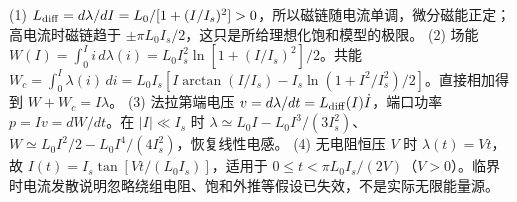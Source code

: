 (1) \(L_{\rm diff}=d\lambda/dI=L_0/[1+(I/I_s)^2]>0\)，所以磁链随电流单调，微分磁能正定；高电流时磁链趋于 \(\pm\pi L_0I_s/2\)，这只是所给理想化饱和模型的极限。
(2) 场能 \(W(I)=\int_0^I i\,d\lambda(i)=L_0I_s^2\ln[1+(I/I_s)^2]/2\)。共能 \(W_c=\int_0^I\lambda(i)\,di=L_0I_s[I\arctan(I/I_s)-I_s\ln(1+I^2/I_s^2)/2]\)。直接相加得到 \(W+W_c=I\lambda\)。
(3) 法拉第端电压 \(v=d\lambda/dt=L_{\rm diff}(I)\dot I\)，端口功率 \(p=Iv=dW/dt\)。在 \(|I|\ll I_s\) 时 \(\lambda\simeq L_0I-L_0I^3/(3I_s^2)\)、\(W\simeq L_0I^2/2-L_0I^4/(4I_s^2)\)，恢复线性电感。
(4) 无电阻恒压 \(V\) 时 \(\lambda(t)=Vt\)，故 \(I(t)=I_s\tan[Vt/(L_0I_s)]\)，适用于 \(0\le t<\pi L_0I_s/(2V)\)（\(V>0\)）。临界时电流发散说明忽略绕组电阻、饱和外推等假设已失效，不是实际无限能量源。
